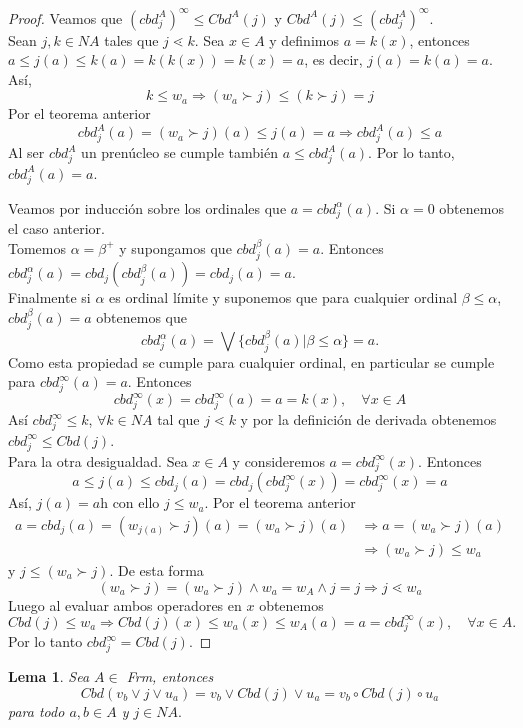 \documentclass[12pt,letterpaper,titlepage]{article}
\newtheorem{lemma}{Lema}
\theoremstyle{definition}
\newcommand\<{\langle}
\renewcommand\>{\rangle}
\begin{document}
\begin{proof}Veamos que $(cbd_j^A)^\infty\leq Cbd^A(j)$ y $Cbd^A(j)\leq (cbd_j^A)^\infty$.\\
Sean $j,k\in NA$ tales que $j\lessdot k$. Sea $x\in A$ y definimos $a=k(x)$, entonces $a\leq j(a)\leq k(a)=k(k(x))=k(x)=a$, es decir, $j(a)=k(a)=a$. Así, $$k\leq w_a\Rightarrow (w_a\succ j)\leq (k\succ j)=j$$ 
Por el teorema anterior $$cbd_j^A(a)=(w_a\succ j)(a)\leq j(a)=a \Rightarrow cbd_j^A(a)\leq a$$
Al ser $cbd_j^A$ un prenúcleo se cumple también $a\leq cbd_j^A(a)$. Por lo tanto, $cbd_j^A(a)=a$.

\noindent
Veamos por inducción sobre los ordinales que $a=cbd_j^\alpha(a)$. Si $\alpha=0$ obtenemos el caso anterior.\\
Tomemos $\alpha=\beta^{+}$ y supongamos que $cbd_j^\beta(a)=a$. Entonces $cbd_j^\alpha (a)=cbd_j(cbd_j^\beta(a))=cbd_j(a)=a$.\\
Finalmente si $\alpha$ es ordinal límite y suponemos que para cualquier ordinal $\beta\leq \alpha$, $cbd_j^\beta(a)=a$ obtenemos que $$cbd_j^\alpha(a)=\bigvee \{cbd_j^\beta(a)|\beta\leq \alpha\}=a.$$
Como esta propiedad se cumple para cualquier ordinal, en particular se cumple para $cbd_j^\infty(a)=a$. Entonces $$cbd_j^\infty(x)=cbd_j^\infty(a)=a=k(x), \quad \forall x\in A$$
Así $cbd_j^\infty\leq k$, $\forall k\in NA$ tal que $j\lessdot k$ y por la definición de derivada obtenemos $cbd_j^\infty\leq Cbd(j)$.\\
Para la otra desigualdad. Sea $x\in A$ y consideremos $a=cbd_j^\infty(x)$. Entonces $$a\leq j(a)\leq cbd_j(a)=cbd_j(cbd_j^\infty(x))=cbd_j^\infty(x)=a$$
Así, $j(a)=a$h con ello $j\leq w_a$. Por el teorema anterior
\begin{equation*}
\begin{split}
a=cbd_j(a)=(w_{j(a)}\succ j)(a)=(w_a\succ j)(a) & \Rightarrow a=(w_a\succ j)(a)\\
& \Rightarrow (w_a\succ j)\leq w_a
\end{split}
\end{equation*}
y $j\leq (w_a\succ j)$. De esta forma 
$$(w_a\succ j)=(w_a\succ j)\wedge w_a=w_A\wedge j=j\Rightarrow j\lessdot w_a$$
Luego al evaluar ambos operadores en $x$ obtenemos $$Cbd(j)\leq w_a\Rightarrow Cbd(j)(x)\leq w_a(x)\leq w_A(a)=a=cbd_j^\infty(x), \quad\forall x\in A.$$ 
Por lo tanto $cbd_j^\infty=Cbd(j)$.

\end{proof}

\begin{lemma}
Sea $A\in$ \textit{Frm}, entonces 
$$Cbd(v_b\vee j\vee u_a)=v_b\vee Cbd(j)\vee u_a=v_b\circ Cbd(j)\circ u_a$$
para todo $a,b\in A$ y $j\in NA.$
\end{lemma}
\end{document}
